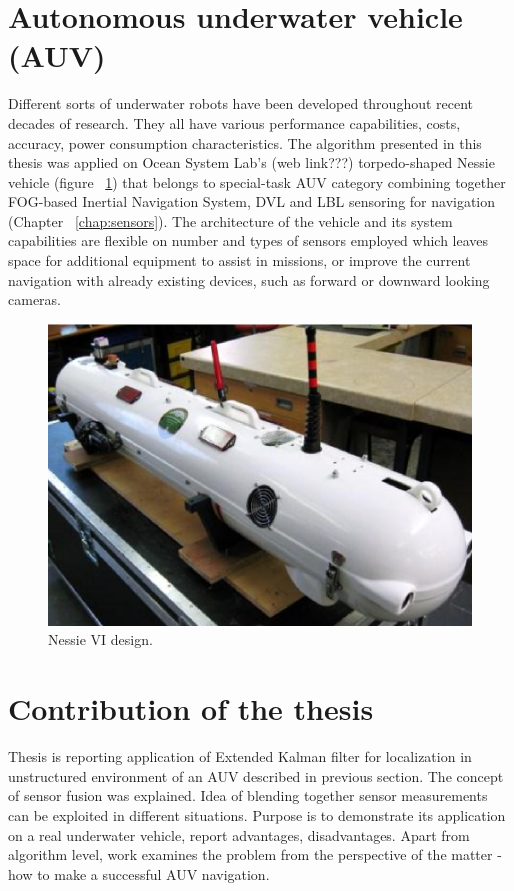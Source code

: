 \section{Autonomous underwater vehicle (AUV)}
Different sorts of underwater robots have been developed throughout recent decades of research. They all have various performance capabilities, costs, accuracy, power consumption characteristics. The algorithm presented in this thesis was applied on Ocean System Lab's (web link???) torpedo-shaped Nessie vehicle (figure ~\ref{fig:nessie6}) that belongs to special-task AUV category \cite{bahr08} combining together FOG-based Inertial Navigation System, DVL and LBL sensoring for navigation (Chapter ~\ref{chap:sensors}). The architecture of the vehicle and its system capabilities are flexible on number and types of sensors employed which leaves space for additional equipment to assist in missions, or improve the current navigation with already existing devices, such as forward or downward looking cameras. 

\begin{figure}%
\centering
\includegraphics[width=0.5\linewidth]{intro/fig/nessie6.eps}
\caption{Nessie VI design.}
\label{fig:nessie6}
\end{figure} 

\section{Contribution of the thesis}
Thesis is reporting application of Extended Kalman filter for localization in unstructured environment of an AUV described in previous section. The concept of sensor fusion was explained. Idea of blending together sensor measurements can be exploited in different situations. Purpose is to demonstrate its application on a real underwater vehicle, report advantages, disadvantages. Apart from algorithm level, work examines the problem from the perspective of the matter - how to make a successful AUV navigation. 
